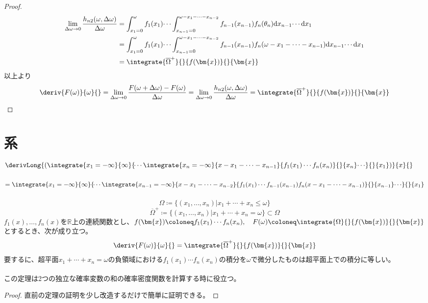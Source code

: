 \begin{proof}
            \begin{align*}
                \lim_{\domega\to 0}\frac{h_{n2}(\omega,\domega)}{\domega} &= \int_{x_1=0}^{\omega}f_1(x_1)\dotsi\int_{x_{n-1}=0}^{\omega-x_1-\dotsb-x_{n-2}}f_{n-1}(x_{n-1})f_n(\theta_n)\d{x_{n-1}}\dotsi\d{x_1} \\
                &= \int_{x_1=0}^{\omega}f_1(x_1)\dotsi\int_{x_{n-1}=0}^{\omega-x_1-\dotsb-x_{n-2}}f_{n-1}(x_{n-1})f_n(\omega-x_1-\dotsb-x_{n-1})\d{x_{n-1}}\dotsi\d{x_1} \\
                &= \integrate{\overline{\Omega}^+}{}{f(\bm{x})}{}{\bm{x}}
            \end{align*}
            以上より
            \[\deriv{F(\omega)}{\omega}{} = \lim_{\domega \to 0}\frac{F(\omega+\domega)-F(\omega)}{\domega} = \lim_{\domega\to 0}\frac{h_{n2}(\omega,\domega)}{\domega} = \integrate{\overline{\Omega}^+}{}{f(\bm{x})}{}{\bm{x}}\]
        \end{proof}
    \section{
        系\texorpdfstring{\\}{}
        \small{
            \texorpdfstring{$\derivLong{\left(\integrate{x_1=-\infty}{\infty}{\dotsi\integrate{x_n=-\infty}{x-x_1-\dotsb-x_{n-1}}{f_1(x_1)\dotsm f_n(x_n)}{}{x_n}\dotsi}{}{x_1}\right)}{x}{}$\\}{}
            \texorpdfstring{$= \integrate{x_1=-\infty}{\infty}{\dotsi\integrate{x_{n-1}=-\infty}{x-x_1-\dotsb-x_{n-2}}{f_1(x_1)\dotsm f_{n-1}(x_{n-1})f_n(x-x_1-\dotsb-x_{n-1})}{}{x_{n-1}}\dotsi}{}{x_1}$}{}
        }
    }
        \label{重積分の微分の系}
        \begin{shadebox}
            \[\Omega\coloneq\{(x_1,\dotsc,x_n)|x_1+\dotsb+x_n \leq \omega\}\]
            \[\overline{\Omega}^+\coloneq\{(x_1,\dotsc,x_n)|x_1+\dotsb+x_n = \omega\} \subset \Omega\]
            $f_1(x),\dotsc,f_n(x)$を$\mathbb{R}$上の連続関数とし、$f(\bm{x})\coloneq f_1(x_1)\dotsm f_n(x_n),\quad F(\omega) \coloneq \integrate{\Omega}{}{f(\bm{x})}{}{\bm{x}}$とするとき、次が成り立つ。
            \[\deriv{F(\omega)}{\omega}{} = \integrate{\overline{\Omega}^+}{}{f(\bm{x})}{}{\bm{x}}\]
            要するに、超平面$x_1+\dotsb+x_n=\omega$の負領域における$f_1(x_1)\dotsm f_n(x_n)$の積分を$\omega$で微分したものは超平面上での積分に等しい。\\
            \\
            \quad この定理は2つの独立な確率変数の和の確率密度関数を計算する時に役立つ。
        \end{shadebox}
        \begin{proof}
            \quad\par
            直前の定理の証明を少し改造するだけで簡単に証明できる。
        \end{proof}